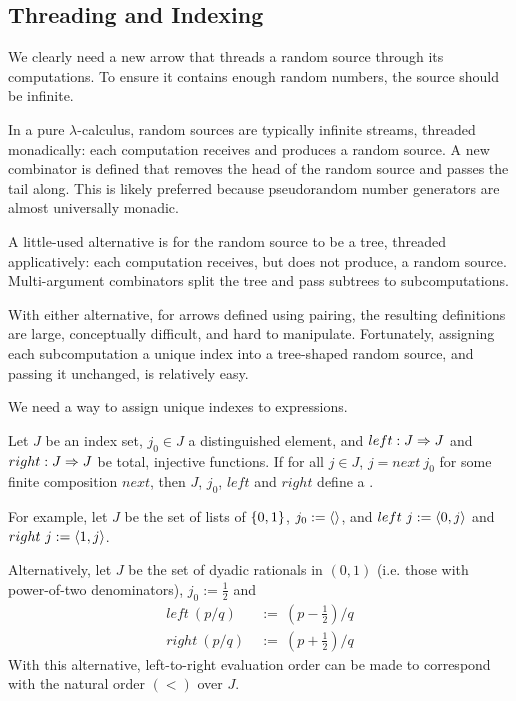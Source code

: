 \documentclass[preprint]{sigplanconf}
\begin{document}
\subsection{Threading and Indexing}

We clearly need a new arrow that threads a random source through its computations.
To ensure it contains enough random numbers, the source should be infinite.

In a pure $\lambda$-calculus, random sources are typically infinite streams, threaded monadically: each computation receives and produces a random source.
A new combinator is defined that removes the head of the random source and passes the tail along.
This is likely preferred because pseudorandom number generators are almost universally monadic.

A little-used alternative is for the random source to be a tree, threaded applicatively:
each computation receives, but does not produce, a random source.
Multi-argument combinators split the tree and pass subtrees to subcomputations.

With either alternative, for arrows defined using pairing, the resulting definitions are large, conceptually difficult, and hard to manipulate.
Fortunately, assigning each subcomputation a unique index into a tree-shaped random source, and passing it unchanged, is relatively easy.

We need a way to assign unique indexes to expressions.

\begin{definition}
Let $J$ be an index set, $j_0 \in J$ a distinguished element, and $left : J \Rightarrow J$ and $right : J \Rightarrow J$ be total, injective functions. If for all $j \in J$, $j = next~j_0$ for some finite composition $next$, then $J$, $j_0$, $left$ and $right$ define a .
\end{definition}

For example, let $J$ be the set of lists of $\{{0,1}\}$, $j_0 := \langle{}\rangle$, and $left~j := \langle{0,j}\rangle$ and $right~j := \langle{1,j}\rangle$.

Alternatively, let $J$ be the set of dyadic rationals in $(0,1)$ (i.e. those with power-of-two denominators), $j_0 := \tfrac{1}{2}$ and
\begin{equation}
\begin{aligned}
	left~(p/q) &\ := \ (p-\tfrac{1}{2})/q
\\
	right~(p/q) &\ := \ (p+\tfrac{1}{2})/q
\end{aligned}
\end{equation}
With this alternative, left-to-right evaluation order can be made to correspond with the natural order $(<)$ over $J$.
\end{document}
